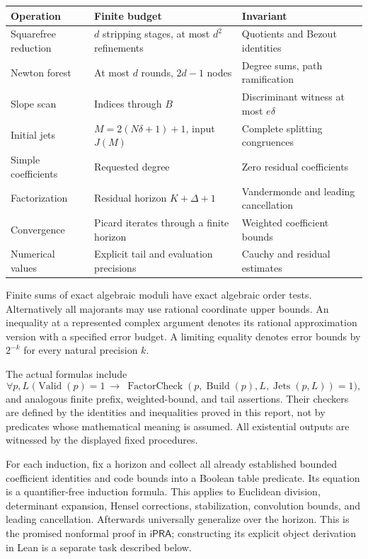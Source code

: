 \documentclass[11pt]{article}
\theoremstyle{definition}
\newcommand{\ipra}{\ensuremath{\mathsf{iPRA}}}
\begin{document}
\begin{center}
\small
\begin{tabular}{p{.24\linewidth}p{.34\linewidth}p{.31\linewidth}}
\toprule
Operation & Finite budget & Invariant\\
\midrule
Squarefree reduction & \(d\) stripping stages, at most \(d^2\) refinements & Quotients and Bezout identities\\
Newton forest & At most \(d\) rounds, \(2d-1\) nodes & Degree sums, path ramification\\
Slope scan & Indices through \(B\) & Discriminant witness at most \(e\delta\)\\
Initial jets & \(M=2(N\delta+1)+1\), input \(J(M)\) & Complete splitting congruences\\
Simple coefficients & Requested degree & Zero residual coefficients\\
Factorization & Residual horizon \(K+\Delta+1\) & Vandermonde and leading cancellation\\
Convergence & Picard iterates through a finite horizon & Weighted coefficient bounds\\
Numerical values & Explicit tail and evaluation precisions & Cauchy and residual estimates\\
\bottomrule
\end{tabular}
\end{center}

Finite sums of exact algebraic moduli have exact algebraic order tests.
Alternatively all majorants may use rational coordinate upper bounds.
An inequality at a represented complex argument denotes its rational
approximation version with a specified error budget.
A limiting equality denotes error bounds by \(2^{-k}\) for every
natural precision \(k\).

The actual formulas include
\[
 \forall p,L\;\bigl(\operatorname{Valid}(p)=1\ \longrightarrow\
 \operatorname{FactorCheck}(p,\operatorname{Build}(p),L,
                         \operatorname{Jets}(p,L))=1\bigr),
\]
and analogous finite prefix, weighted-bound, and tail assertions.
Their checkers are defined by the identities and inequalities proved in
this report, not by predicates whose mathematical meaning is assumed.
All existential outputs are witnessed by the displayed fixed procedures.

For each induction, fix a horizon and collect all already established
bounded coefficient identities and code bounds into a Boolean table
predicate. Its equation is a quantifier-free induction formula.
This applies to Euclidean division, determinant expansion, Hensel
corrections, stabilization, convolution bounds, and leading cancellation.
Afterwards universally generalize over the horizon.
This is the promised nonformal proof in \ipra; constructing its explicit
object derivation in Lean is a separate task described below.
\end{document}
